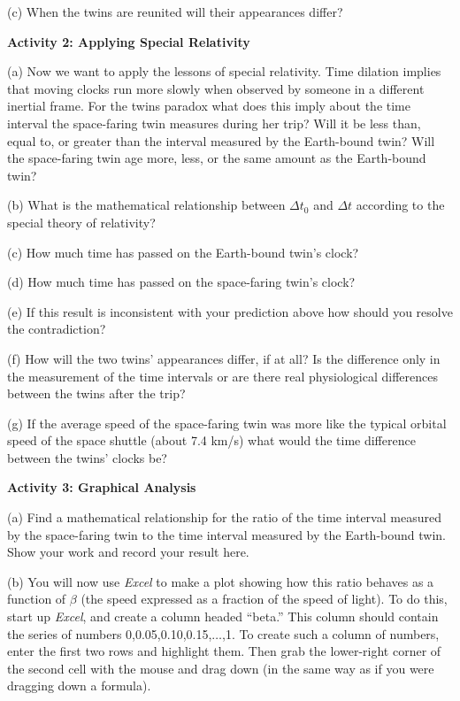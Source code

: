 (c) When the twins are reunited will their appearances differ?
\vspace{15mm}

\textbf{Activity 2: Applying Special Relativity}

(a) Now we want to apply the lessons of special relativity. Time dilation
implies that moving clocks run more slowly when observed by someone
in a different inertial frame. For the twins paradox what does this
imply about the time interval the space-faring twin measures during
her trip? Will it be less than, equal to, or greater than the interval
measured by the Earth-bound twin? Will the space-faring twin age more,
less, or the same amount as the Earth-bound twin?
\vspace{35mm}

(b) What is the mathematical relationship between \( \Delta  t_{0} \)
and \( \Delta  t\) according to the special theory of relativity?
\vspace{15mm}

(c) How much time has passed on the Earth-bound twin's clock?
\vspace{15mm}

(d) How much time has passed on the space-faring twin's clock?
\vspace{15mm}

(e) If this result is inconsistent with your prediction above how
should you resolve the contradiction?
\vspace{15mm}

(f) How will the two twins' appearances differ, if at all? Is the
difference only in the measurement of the time intervals or are there
real physiological differences between the twins after the trip?
\vspace{15mm}

(g) If the average speed of the space-faring twin was more like the
typical orbital speed of the space shuttle (about 7.4 km/s) what would
the time difference between the twins' clocks be?
\vspace{15mm}

\textbf{Activity 3: Graphical Analysis}

(a) Find a mathematical relationship for the ratio of the time interval
measured by the space-faring twin to the time interval measured by
the Earth-bound twin. Show your work and record your result here.
\vspace{45mm}

(b) You will now use \textit{Excel} to make a plot showing how this
ratio behaves as a function of $\beta$ (the speed expressed
as a fraction of the speed of light).
To do this, start up \textit{Excel}, and create a column headed
``beta.''  This column should contain the series of numbers
0,0.05,0.10,0.15,$\ldots$,1.    To create
such a column of numbers, enter the first two rows and highlight
them.  Then grab the lower-right corner of the second cell with
the mouse and drag down (in the same way as if you were dragging
down a formula).  

